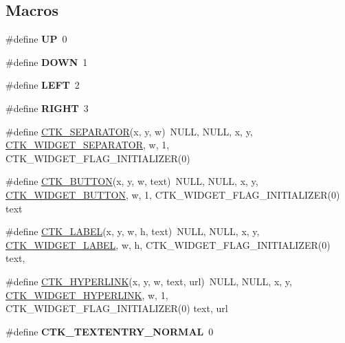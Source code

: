 \subsection*{Macros}
\begin{DoxyCompactItemize}
\item 
\hypertarget{group__ctkappfunc_ga1965eaca47dbf3f87acdafc2208f04eb}{}\#define {\bfseries U\+P}~0\label{group__ctkappfunc_ga1965eaca47dbf3f87acdafc2208f04eb}

\item 
\hypertarget{group__ctkappfunc_ga4193cd1c8c2e6ebd0e056fa2364a663f}{}\#define {\bfseries D\+O\+W\+N}~1\label{group__ctkappfunc_ga4193cd1c8c2e6ebd0e056fa2364a663f}

\item 
\hypertarget{group__ctkappfunc_ga437ef08681e7210d6678427030446a54}{}\#define {\bfseries L\+E\+F\+T}~2\label{group__ctkappfunc_ga437ef08681e7210d6678427030446a54}

\item 
\hypertarget{group__ctkappfunc_ga80fb826a684cf3f0d306b22aa100ddac}{}\#define {\bfseries R\+I\+G\+H\+T}~3\label{group__ctkappfunc_ga80fb826a684cf3f0d306b22aa100ddac}

\item 
\#define \hyperlink{group__ctkappfunc_ga672f42ca81388e602f2408a3e4ac4397}{C\+T\+K\+\_\+\+S\+E\+P\+A\+R\+A\+T\+O\+R}(x,  y,  w)~N\+U\+L\+L, N\+U\+L\+L, x, y, \hyperlink{group__ctkdraw_ga0d2cd2b8d5b238bdeedb7a8cf5c0e58a}{C\+T\+K\+\_\+\+W\+I\+D\+G\+E\+T\+\_\+\+S\+E\+P\+A\+R\+A\+T\+O\+R}, w, 1, C\+T\+K\+\_\+\+W\+I\+D\+G\+E\+T\+\_\+\+F\+L\+A\+G\+\_\+\+I\+N\+I\+T\+I\+A\+L\+I\+Z\+E\+R(0)
\item 
\#define \hyperlink{group__ctkappfunc_ga188838fd9c43d2d1e039d0b732679d6b}{C\+T\+K\+\_\+\+B\+U\+T\+T\+O\+N}(x,  y,  w,  text)~N\+U\+L\+L, N\+U\+L\+L, x, y, \hyperlink{group__ctkdraw_gae8adf9839c98a840b0b9b7c070422440}{C\+T\+K\+\_\+\+W\+I\+D\+G\+E\+T\+\_\+\+B\+U\+T\+T\+O\+N}, w, 1, C\+T\+K\+\_\+\+W\+I\+D\+G\+E\+T\+\_\+\+F\+L\+A\+G\+\_\+\+I\+N\+I\+T\+I\+A\+L\+I\+Z\+E\+R(0) text
\item 
\#define \hyperlink{group__ctkappfunc_ga29db06b6a52bcd18163f4a2f220d3850}{C\+T\+K\+\_\+\+L\+A\+B\+E\+L}(x,  y,  w,  h,  text)~N\+U\+L\+L, N\+U\+L\+L, x, y, \hyperlink{group__ctkdraw_ga1fb739218fa5f53c992a3bcf2c7e0c57}{C\+T\+K\+\_\+\+W\+I\+D\+G\+E\+T\+\_\+\+L\+A\+B\+E\+L}, w, h, C\+T\+K\+\_\+\+W\+I\+D\+G\+E\+T\+\_\+\+F\+L\+A\+G\+\_\+\+I\+N\+I\+T\+I\+A\+L\+I\+Z\+E\+R(0) text,
\item 
\#define \hyperlink{group__ctkappfunc_gae6651dea3166c23c82645ca6ce418ea4}{C\+T\+K\+\_\+\+H\+Y\+P\+E\+R\+L\+I\+N\+K}(x,  y,  w,  text,  url)~N\+U\+L\+L, N\+U\+L\+L, x, y, \hyperlink{group__ctkdraw_gad35ef85bb5562d70cee05f97968dadbc}{C\+T\+K\+\_\+\+W\+I\+D\+G\+E\+T\+\_\+\+H\+Y\+P\+E\+R\+L\+I\+N\+K}, w, 1, C\+T\+K\+\_\+\+W\+I\+D\+G\+E\+T\+\_\+\+F\+L\+A\+G\+\_\+\+I\+N\+I\+T\+I\+A\+L\+I\+Z\+E\+R(0) text, url
\item 
\hypertarget{group__ctkappfunc_ga9c4133d2f176a81c74b9c1ff19d57d0d}{}\#define {\bfseries C\+T\+K\+\_\+\+T\+E\+X\+T\+E\+N\+T\+R\+Y\+\_\+\+N\+O\+R\+M\+A\+L}~0\label{group__ctkappfunc_ga9c4133d2f176a81c74b9c1ff19d57d0d}


\end{DoxyCompactItemize}
